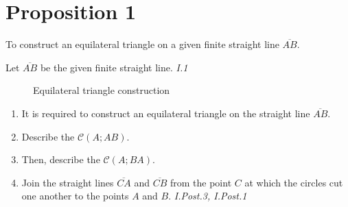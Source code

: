 
\section*{Proposition 1}

\renewcommand\qedsymbol{Q.E.F}
    
\begin{con}
        To construct an equilateral triangle on a given finite straight line $\overline{AB}$.
\end{con}

Let $\overline{AB}$ be the given finite straight line.\hfill\textit{ I.1}

\begin{figure}[H]
		\caption{Equilateral triangle construction}
\end{figure}


\begin{enumerate}
  	\item  It is required to construct an equilateral triangle on the straight line $\overline{AB}$.  
  	\item Describe the $\mathscr{C}(A;AB)$.  
  	\item Then,  describe the $\mathscr{C}(A;BA)$. 
  	\item Join the straight lines $\overline{CA}$ and $\overline{CB}$ from the point $C$ at which the circles cut one another to the points $A$ and $B$. \hfill\textit{ I.Post.3, I.Post.1}
  \end{enumerate}

